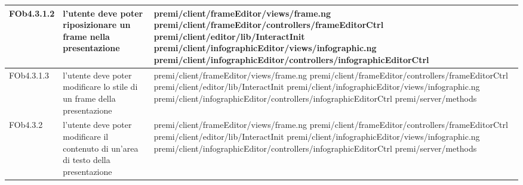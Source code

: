 \begin{longtable}{|l|p{5cm}|p{7cm}|}
\hline
FOb4.3.1.2 & l'utente deve poter riposizionare un frame nella presentazione &\hspace{0pt}premi/client/frameEditor/views/frame.ng \linebreak \linebreak premi/client/frameEditor/controllers/frameEditorCtrl \linebreak \linebreak premi/client/editor/lib/InteractInit \linebreak \linebreak premi/client/infographicEditor/views/infographic.ng \linebreak \linebreak premi/client/infographicEditor/controllers/infographicEditorCtrl \\
\hline
FOb4.3.1.3 & l'utente deve poter modificare lo stile di un frame della presentazione & \hspace{0pt}premi/client/frameEditor/views/frame.ng \linebreak \linebreak premi/client/frameEditor/controllers/frameEditorCtrl \linebreak \linebreak premi/client/editor/lib/InteractInit \linebreak \linebreak premi/client/infographicEditor/views/infographic.ng \linebreak \linebreak premi/client/infographicEditor/controllers/infographicEditorCtrl  \linebreak \linebreak premi/server/methods \\
\hline
FOb4.3.2 & l'utente deve poter modificare il contenuto di un'area di testo della presentazione & \hspace{0pt}premi/client/frameEditor/views/frame.ng \linebreak \linebreak premi/client/frameEditor/controllers/frameEditorCtrl \linebreak \linebreak premi/client/editor/lib/InteractInit \linebreak \linebreak premi/client/infographicEditor/views/infographic.ng \linebreak \linebreak premi/client/infographicEditor/controllers/infographicEditorCtrl  \linebreak \linebreak premi/server/methods \\

\end{longtable}
